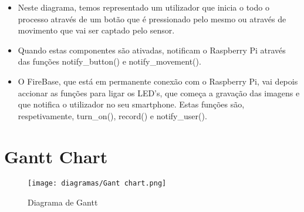 \documentclass{article}
\begin{document}
\begin{itemize}
    \item Neste diagrama, temos representado um utilizador que inicia o todo o processo através de um botão que é pressionado pelo mesmo ou através de movimento que vai ser captado pelo sensor.

    \item Quando estas componentes são ativadas, notificam o Raspberry Pi através das funções notify\_button() e notify\_movement().

    \item O FireBase, que está em permanente conexão com o Raspberry Pi, vai depois accionar as funções para ligar os LED's, que começa a gravação das imagens e que notifica o utilizador no seu smartphone. Estas funções são, respetivamente, turn\_on(), record() e notify\_user().

\end{itemize}

\section{Gantt Chart}

\begin{figure}[h!]
    \centering
    \texttt{[image: diagramas/Gant chart.png]}
    \caption{Diagrama de Gantt}
    \label{fig:diagGantt}
\end{figure}







%
%
%
% 
\end{document}
